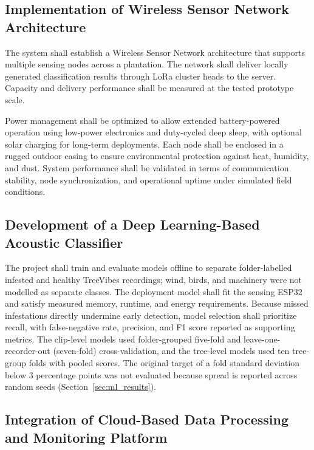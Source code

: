 \documentclass[12pt,a4paper,oneside]{memoir}
\newcommand{\newrevision}[1]{#1}
\begin{document}
\subsection{Implementation of Wireless Sensor Network Architecture}
 
\newrevision{The system shall establish a Wireless Sensor Network architecture that supports multiple sensing nodes across a plantation. The network shall deliver locally generated classification results through LoRa cluster heads to the server. Capacity and delivery performance shall be measured at the tested prototype scale.}
 
Power management shall be optimized to allow extended battery-powered operation using low-power electronics and duty-cycled deep sleep, with optional solar charging for long-term deployments. Each node shall be enclosed in a rugged outdoor casing to ensure environmental protection against heat, humidity, and dust. System performance shall be validated in terms of communication stability, node synchronization, and operational uptime under simulated field conditions.
 
 
\subsection{Development of a Deep Learning-Based Acoustic Classifier}
 
\newrevision{The project shall train and evaluate models offline to separate folder-labelled infested and healthy TreeVibes recordings; wind, birds, and machinery were not modelled as separate classes. The deployment model shall fit the sensing ESP32 and satisfy measured memory, runtime, and energy requirements. Because missed infestations directly undermine early detection, model selection shall prioritize recall, with false-negative rate, precision, and F1 score reported as supporting metrics. The clip-level models used folder-grouped five-fold and leave-one-recorder-out (seven-fold) cross-validation, and the tree-level models used ten tree-group folds with pooled scores. The original target of a fold standard deviation below 3 percentage points was not evaluated because spread is reported across random seeds (Section~\ref{sec:ml_results}).}
 
 
\subsection{Integration of Cloud-Based Data Processing and Monitoring Platform}
 
\end{document}

